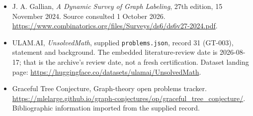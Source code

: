 \documentclass[11pt,a4paper]{article}
\begin{document}
{\small

\begin{itemize}
\item[E1] J. A. Gallian, \emph{A Dynamic Survey of Graph Labeling}, 27th edition, 15 November 2024. Source consulted 1 October 2026. \url{https://www.combinatorics.org/files/Surveys/ds6/ds6v27-2024.pdf}.


\item[\hypertarget{source:31:1}{S1}] ULAM.AI, \emph{UnsolvedMath}, supplied \texttt{problems.json}, record 31 (GT-003), statement and background. The embedded literature-review date is 2026-08-17; that is the archive’s review date, not a fresh certification. Dataset landing page: \url{https://huggingface.co/datasets/ulamai/UnsolvedMath}.

\item[\hypertarget{source:31:2}{S2}] Graceful Tree Conjecture, Graph-theory open problems tracker. \url{https://mlelarge.github.io/graph-conjectures/op/graceful_tree_conjecture/}. Bibliographic information imported from the supplied record.

\end{itemize}

}

\label{end:31}
\end{document}
